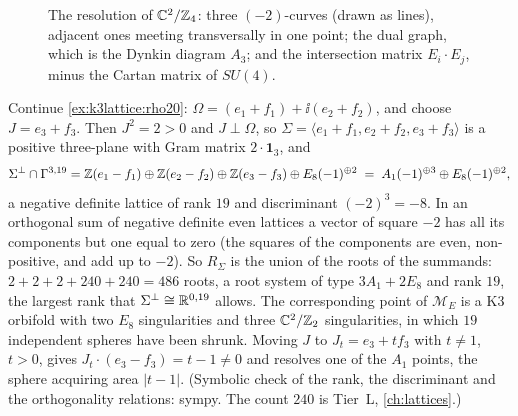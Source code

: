 \begin{figure}[t]
\centering
{}
\caption{The resolution of $\mathbb{C}^2/\mathbb{Z}_4$: three $(-2)$-curves (drawn as lines), adjacent ones
meeting transversally in one point; the dual graph, which is the Dynkin diagram $A_3$; and
the intersection matrix $E_i\cdot E_j$, minus the Cartan matrix of $SU(4)$.}
\label{fig:k3lattice:chain}
\end{figure}

\begin{example}\label{ex:k3lattice:maximal}
Continue \cref{ex:k3lattice:rho20}: $\Omega=(e_1+f_1)+\ii(e_2+f_2)$, and choose $J=e_3+f_3$.
Then $J^2=2>0$ and $J\perp\Omega$, so $\Sigma=\langle e_1+f_1,e_2+f_2,e_3+f_3\rangle$ is a
positive three-plane with Gram matrix $2\cdot\mathbf 1_3$, and
\[
 \Sigma^\perp\cap\Gamma^{3,19}=\mathbb{Z}(e_1-f_1)\oplus\mathbb{Z}(e_2-f_2)\oplus\mathbb{Z}(e_3-f_3)\oplus
 E_8(-1)^{\oplus2}\;=\;A_1(-1)^{\oplus3}\oplus E_8(-1)^{\oplus2},
\]
a negative definite lattice of rank $19$ and discriminant $(-2)^3=-8$. In an orthogonal sum
of negative definite even lattices a vector of square $-2$ has all its components but one
equal to zero (the squares of the components are even, non-positive, and add up to $-2$).
So $R_\Sigma$ is the union of the roots of the summands: $2+2+2+240+240=486$ roots, a root
system of type $3A_1+2E_8$ and rank $19$, the largest rank that $\Sigma^\perp\cong\mathbb{R}^{0,19}$
allows. The corresponding point of $\mathcal M_E$ is a K3 orbifold with two $E_8$
singularities and three $\mathbb{C}^2/\mathbb{Z}_2$ singularities, in which $19$ independent spheres have
been shrunk. Moving $J$ to $J_t=e_3+tf_3$ with $t\ne1$, $t>0$, gives
$J_t\cdot(e_3-f_3)=t-1\ne0$ and resolves one of the $A_1$ points, the sphere acquiring area
$|t-1|$. (Symbolic check of the rank, the discriminant and the orthogonality relations:
sympy. The count $240$ is Tier~L, \cref{ch:lattices}.)
\end{example}

